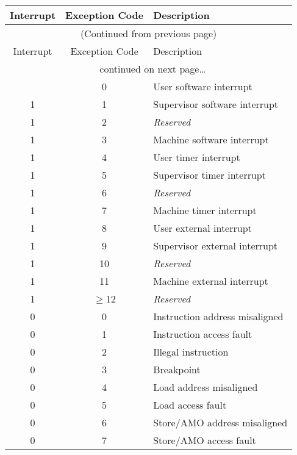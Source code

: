 \begin{longtable}[]{@{}ccl@{}}
\toprule
Interrupt & Exception Code & Description\tabularnewline
\midrule
\endfirsthead
\multicolumn{3}{c}{{(Continued from previous page)}} \\

\toprule
Interrupt & Exception Code & Description\tabularnewline
\midrule
\endhead

\midrule \multicolumn{3}{c}{{\tablename\ \thetable{} continued on next page\ldots}} \\
\endfoot

\endlastfoot
  1         & 0               & User software interrupt \\
  1         & 1               & Supervisor software interrupt \\
  1         & 2               & \emph{Reserved} \\
  1         & 3               & Machine software interrupt \\ \hline
  1         & 4               & User timer interrupt \\
  1         & 5               & Supervisor timer interrupt \\
  1         & 6               & \emph{Reserved} \\
  1         & 7               & Machine timer interrupt \\ \hline
  1         & 8               & User external interrupt \\
  1         & 9               & Supervisor external interrupt \\
  1         & 10              & \emph{Reserved} \\
  1         & 11              & Machine external interrupt \\ \hline
  1         & $\ge$12         & \emph{Reserved} \\ \hline
  0         & 0               & Instruction address misaligned \\
  0         & 1               & Instruction access fault \\
  0         & 2               & Illegal instruction \\
  0         & 3               & Breakpoint \\
  0         & 4               & Load address misaligned \\
  0         & 5               & Load access fault \\
  0         & 6               & Store/AMO address misaligned \\
  0         & 7               & Store/AMO access fault \\

\end{longtable}
